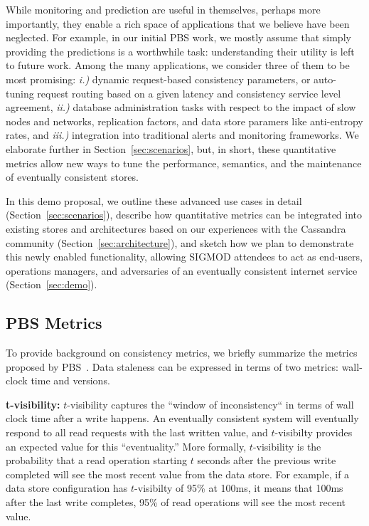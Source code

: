 While monitoring and prediction are useful in themselves, perhaps more
importantly, they enable a rich space of applications that we believe
have been neglected. For example, in our initial PBS work, we mostly
assume that simply providing the predictions is a worthwhile task:
understanding their utility is left to future work. Among the many 
applications, we consider three of them to be most promising: \textit{i.)} dynamic
request-based consistency parameters, or auto-tuning request routing
based on a given latency and consistency service level agreement,
\textit{ii.)} database administration tasks with respect to the impact
of slow nodes and networks, replication factors, and data store
paramers like anti-entropy rates, and \textit{iii.)} integration into
traditional alerts and monitoring frameworks. We elaborate further in
Section~\ref{sec:scenarios}, but, in short, these quantitative metrics
allow new ways to tune the performance, semantics, and the maintenance
of eventually consistent stores.

In this demo proposal, we outline these advanced use cases in detail
(Section~\ref{sec:scenarios}), describe how quantitative metrics
can be integrated into existing stores and architectures based on our
experiences with the Cassandra community
(Section~\ref{sec:architecture}), and sketch how we plan to
demonstrate this newly enabled functionality, allowing SIGMOD
attendees to act as end-users, operations managers, and
adversaries of an eventually consistent internet service
(Section~\ref{sec:demo}).

\subsection{PBS Metrics}
To provide background on consistency metrics, we briefly summarize the
metrics proposed by PBS~\cite{pbs-vldb2012}. Data
staleness can be expressed in terms of two metrics: wall-clock time
and versions.

\textbf{t-visibility:} $t$-visibility captures the ``window of
inconsistency`` in terms of wall clock time after a write happens. An
eventually consistent system will eventually respond to all read
requests with the last written value, and $t$-visibilty provides an expected
value for this ``eventuality.''  More formally, $t$-visibility is the
probability that a read operation starting $t$ seconds after the
previous write completed will see the most recent value from the data
store. For example, if a data store configuration has $t$-visibilty of
95\% at 100ms, it means that 100ms after the last write completes,
95\% of read operations will see the most recent value.

